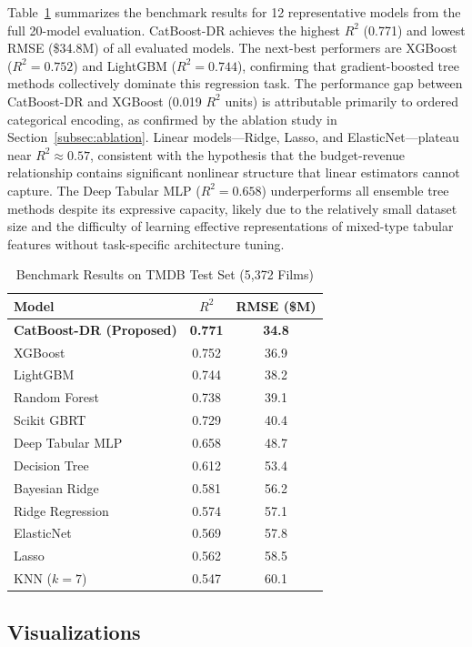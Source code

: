 \documentclass[journal]{IEEEtran}
\begin{document}
Table~\ref{tab:results} summarizes the benchmark results for 12 representative models from the full 20-model evaluation. CatBoost-DR achieves the highest \(R^2\) (0.771) and lowest RMSE (\$34.8M) of all evaluated models. The next-best performers are XGBoost (\(R^2 = 0.752\)) and LightGBM (\(R^2 = 0.744\)), confirming that gradient-boosted tree methods collectively dominate this regression task. The performance gap between CatBoost-DR and XGBoost (0.019 \(R^2\) units) is attributable primarily to ordered categorical encoding, as confirmed by the ablation study in Section~\ref{subsec:ablation}. Linear models—Ridge, Lasso, and ElasticNet—plateau near \(R^2 \approx 0.57\), consistent with the hypothesis that the budget-revenue relationship contains significant nonlinear structure that linear estimators cannot capture. The Deep Tabular MLP (\(R^2 = 0.658\)) underperforms all ensemble tree methods despite its expressive capacity, likely due to the relatively small dataset size and the difficulty of learning effective representations of mixed-type tabular features without task-specific architecture tuning.

\begin{table}[t]
\renewcommand{\arraystretch}{1.2}
\caption{Benchmark Results on TMDB Test Set (5,372 Films)}
\label{tab:results}
\centering
\begin{tabular}{lcc}
\toprule
\textbf{Model} & \textbf{\(R^2\)} & \textbf{RMSE (\$M)} \\
\midrule
\textbf{CatBoost-DR (Proposed)} & \textbf{0.771} & \textbf{34.8} \\
XGBoost & 0.752 & 36.9 \\
LightGBM & 0.744 & 38.2 \\
Random Forest & 0.738 & 39.1 \\
Scikit GBRT & 0.729 & 40.4 \\
Deep Tabular MLP & 0.658 & 48.7 \\
Decision Tree & 0.612 & 53.4 \\
Bayesian Ridge & 0.581 & 56.2 \\
Ridge Regression & 0.574 & 57.1 \\
ElasticNet & 0.569 & 57.8 \\
Lasso & 0.562 & 58.5 \\
KNN (\(k=7\)) & 0.547 & 60.1 \\
\bottomrule
\end{tabular}
\end{table}

\subsection{Visualizations}
\end{document}
